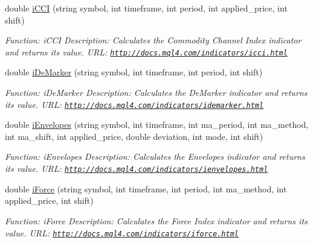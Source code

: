 \begin{DoxyCompactItemize}
double \hyperlink{class_m_q_l4_c_sharp_1_1_base_1_1_m_q_l_base_a08839eb5ede5c7fc62dfd59a05669258}{i\+C\+CI} (string symbol, int timeframe, int period, int applied\+\_\+price, int shift)
\begin{DoxyCompactList}\small\item\em Function\+: i\+C\+CI Description\+: Calculates the Commodity Channel Index indicator and returns its value. U\+RL\+: \href{http://docs.mql4.com/indicators/icci.html}{\tt http\+://docs.\+mql4.\+com/indicators/icci.\+html} \end{DoxyCompactList}\item 
double \hyperlink{class_m_q_l4_c_sharp_1_1_base_1_1_m_q_l_base_ad710d64b2255fbec0a131ea21253d20c}{i\+De\+Marker} (string symbol, int timeframe, int period, int shift)
\begin{DoxyCompactList}\small\item\em Function\+: i\+De\+Marker Description\+: Calculates the De\+Marker indicator and returns its value. U\+RL\+: \href{http://docs.mql4.com/indicators/idemarker.html}{\tt http\+://docs.\+mql4.\+com/indicators/idemarker.\+html} \end{DoxyCompactList}\item 
double \hyperlink{class_m_q_l4_c_sharp_1_1_base_1_1_m_q_l_base_aa67b8410d6892ee30d0b391070c7b060}{i\+Envelopes} (string symbol, int timeframe, int ma\+\_\+period, int ma\+\_\+method, int ma\+\_\+shift, int applied\+\_\+price, double deviation, int mode, int shift)
\begin{DoxyCompactList}\small\item\em Function\+: i\+Envelopes Description\+: Calculates the Envelopes indicator and returns its value. U\+RL\+: \href{http://docs.mql4.com/indicators/ienvelopes.html}{\tt http\+://docs.\+mql4.\+com/indicators/ienvelopes.\+html} \end{DoxyCompactList}\item 
double \hyperlink{class_m_q_l4_c_sharp_1_1_base_1_1_m_q_l_base_a22dc84001f9db0ec5f7c2d8e87a07281}{i\+Force} (string symbol, int timeframe, int period, int ma\+\_\+method, int applied\+\_\+price, int shift)
\begin{DoxyCompactList}\small\item\em Function\+: i\+Force Description\+: Calculates the Force Index indicator and returns its value. U\+RL\+: \href{http://docs.mql4.com/indicators/iforce.html}{\tt http\+://docs.\+mql4.\+com/indicators/iforce.\+html} \end{DoxyCompactList}\item 

\end{DoxyCompactItemize}
